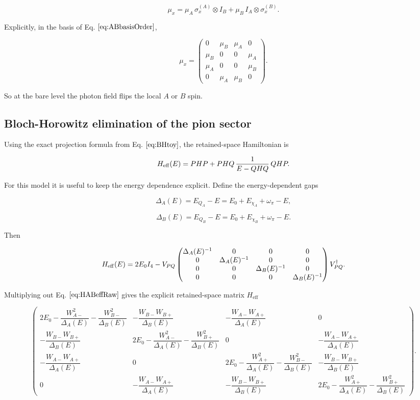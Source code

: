 \documentclass[
]{article}
\renewcommand{\[}{\begin{equation}}
\renewcommand{\]}{\end{equation}}
\begin{document}
\[
\mu_x =
\mu_A\,\sigma_x^{(A)}\otimes I_B
+
\mu_B\,I_A\otimes \sigma_x^{(B)}.
\label{eq:muXABcompact}
\]

Explicitly, in the basis of Eq. \(\ref{eq:ABbasisOrder}\),

\[
\mu_x=
\begin{pmatrix}
0 & \mu_B & \mu_A & 0 \\
\mu_B & 0 & 0 & \mu_A \\
\mu_A & 0 & 0 & \mu_B \\
0 & \mu_A & \mu_B & 0
\end{pmatrix}.
\label{eq:muXABmatrix}
\]

So at the bare level the photon field flips the local \(A\) or \(B\)
spin.

\subsection{Bloch-Horowitz elimination of the pion
sector}\label{bloch-horowitz-elimination-of-the-pion-sector}

Using the exact projection formula from Eq. \(\ref{eq:BHtoy}\), the
retained-space Hamiltonian is

\[
H_{\rm eff}(E)=PHP+PHQ\,\frac{1}{E-QHQ}\,QHP.
\label{eq:HABeffDef}
\]

For this model it is useful to keep the energy dependence explicit.
Define the energy-dependent gaps

\[
\Delta_A(E)=E_{Q_A}-E=E_0+E_{\chi_A}+\omega_\pi-E,
\label{eq:DeltaAE}
\]

\[
\Delta_B(E)=E_{Q_B}-E=E_0+E_{\chi_B}+\omega_\pi-E.
\label{eq:DeltaBE}
\]

Then

\[
H_{\rm eff}(E) =
2E_0 I_4 -
V_{PQ}
\begin{pmatrix}
\Delta_A(E)^{-1} & 0 & 0 & 0 \\
0 & \Delta_A(E)^{-1} & 0 & 0 \\
0 & 0 & \Delta_B(E)^{-1} & 0 \\
0 & 0 & 0 & \Delta_B(E)^{-1}
\end{pmatrix}
V_{PQ}^\dagger .
\label{eq:HABeffRaw}
\]

Multiplying out Eq. \(\ref{eq:HABeffRaw}\) gives the explicit
retained-space matrix \(H_{\text{eff}}\)

\[
\begin{pmatrix}
2E_0-\dfrac{W_{A-}^2}{\Delta_A(E)}-\dfrac{W_{B-}^2}{\Delta_B(E)} &
-\dfrac{W_{B-}W_{B+}}{\Delta_B(E)} &
-\dfrac{W_{A-}W_{A+}}{\Delta_A(E)} &
0
\\[1.0em]
-\dfrac{W_{B-}W_{B+}}{\Delta_B(E)} &
2E_0-\dfrac{W_{A-}^2}{\Delta_A(E)}-\dfrac{W_{B+}^2}{\Delta_B(E)} &
0 &
-\dfrac{W_{A-}W_{A+}}{\Delta_A(E)}
\\[1.0em]
-\dfrac{W_{A-}W_{A+}}{\Delta_A(E)} &
0 &
2E_0-\dfrac{W_{A+}^2}{\Delta_A(E)}-\dfrac{W_{B-}^2}{\Delta_B(E)} &
-\dfrac{W_{B-}W_{B+}}{\Delta_B(E)}
\\[1.0em]
0 &
-\dfrac{W_{A-}W_{A+}}{\Delta_A(E)} &
-\dfrac{W_{B-}W_{B+}}{\Delta_B(E)} &
2E_0-\dfrac{W_{A+}^2}{\Delta_A(E)}-\dfrac{W_{B+}^2}{\Delta_B(E)}
\end{pmatrix}.
\label{eq:HABeffMatrix}
\]
\end{document}
